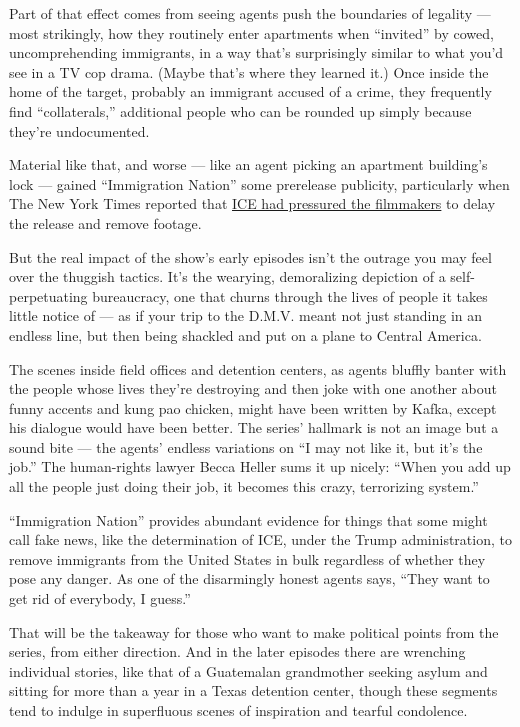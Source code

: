 Part of that effect comes from seeing agents push the boundaries of
legality --- most strikingly, how they routinely enter apartments when
``invited'' by cowed, uncomprehending immigrants, in a way that's
surprisingly similar to what you'd see in a TV cop drama. (Maybe that's
where they learned it.) Once inside the home of the target, probably an
immigrant accused of a crime, they frequently find ``collaterals,''
additional people who can be rounded up simply because they're
undocumented.

Material like that, and worse --- like an agent picking an apartment
building's lock --- gained ``Immigration Nation'' some prerelease
publicity, particularly when The New York Times reported that
\href{https://www.nytimes.com/2020/07/23/us/trump-immigration-nation-netflix.html}{ICE
had pressured the filmmakers} to delay the release and remove footage.

But the real impact of the show's early episodes isn't the outrage you
may feel over the thuggish tactics. It's the wearying, demoralizing
depiction of a self-perpetuating bureaucracy, one that churns through
the lives of people it takes little notice of --- as if your trip to the
D.M.V. meant not just standing in an endless line, but then being
shackled and put on a plane to Central America.

The scenes inside field offices and detention centers, as agents bluffly
banter with the people whose lives they're destroying and then joke with
one another about funny accents and kung pao chicken, might have been
written by Kafka, except his dialogue would have been better. The
series' hallmark is not an image but a sound bite --- the agents'
endless variations on ``I may not like it, but it's the job.'' The
human-rights lawyer Becca Heller sums it up nicely: ``When you add up
all the people just doing their job, it becomes this crazy, terrorizing
system.''

``Immigration Nation'' provides abundant evidence for things that some
might call fake news, like the determination of ICE, under the Trump
administration, to remove immigrants from the United States in bulk
regardless of whether they pose any danger. As one of the disarmingly
honest agents says, ``They want to get rid of everybody, I guess.''

That will be the takeaway for those who want to make political points
from the series, from either direction. And in the later episodes there
are wrenching individual stories, like that of a Guatemalan grandmother
seeking asylum and sitting for more than a year in a Texas detention
center, though these segments tend to indulge in superfluous scenes of
inspiration and tearful condolence.

